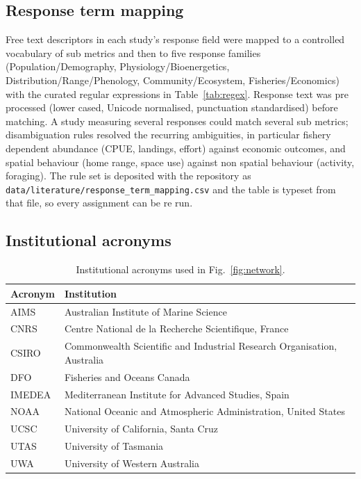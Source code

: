 \documentclass[11pt,a4paper]{article}
\begin{document}
\subsection{Response term mapping}
Free text descriptors in each study's response field were mapped to a controlled vocabulary of sub metrics and then to five response families (Population/Demography, Physiology/Bioenergetics, Distribution/Range/Phenology, Community/Ecosystem, Fisheries/Economics) with the curated regular expressions in Table~\ref{tab:regex}. Response text was pre processed (lower cased, Unicode normalised, punctuation standardised) before matching. A study measuring several responses could match several sub metrics; disambiguation rules resolved the recurring ambiguities, in particular fishery dependent abundance (CPUE, landings, effort) against economic outcomes, and spatial behaviour (home range, space use) against non spatial behaviour (activity, foraging). The rule set is deposited with the repository as \texttt{data/literature/response\_term\_mapping.csv} and the table is typeset from that file, so every assignment can be re run.



\subsection{Institutional acronyms}
\begin{table}[H]\centering
\caption{Institutional acronyms used in Fig.~\ref{fig:network}.}
\label{tab:acronyms}\small
\begin{tabular}{ll}\toprule
Acronym & Institution \\\midrule
AIMS & Australian Institute of Marine Science \\
CNRS & Centre National de la Recherche Scientifique, France \\
CSIRO & Commonwealth Scientific and Industrial Research Organisation, Australia \\
DFO & Fisheries and Oceans Canada \\
IMEDEA & Mediterranean Institute for Advanced Studies, Spain \\
NOAA & National Oceanic and Atmospheric Administration, United States \\
UCSC & University of California, Santa Cruz \\
UTAS & University of Tasmania \\
UWA & University of Western Australia \\
\bottomrule\end{tabular}\end{table}
\end{document}
